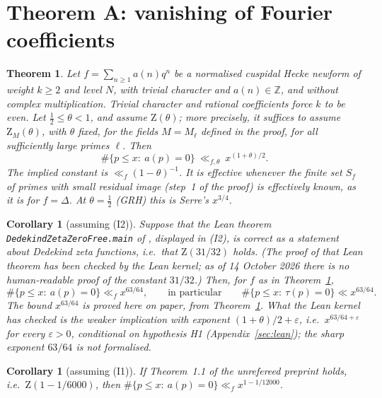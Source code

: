 \documentclass[11pt]{amsart}
\newtheorem{mainthm}{Theorem}
\newtheorem{corollary}[theorem]{Corollary}
\theoremstyle{definition}
\theoremstyle{remark}
\newcommand{\Z}{\mathbb{Z}}
\newcommand{\Zt}{\mathrm{Z}}       %
\begin{document}
\section{Theorem A: vanishing of Fourier coefficients}\label{sec:A}

\begin{mainthm}\label{thm:A}
Let $f=\sum_{n\ge1}a(n)q^n$ be a normalised cuspidal Hecke newform of weight $k\ge2$ and level $N$, with trivial
character and $a(n)\in\Z$, and without complex multiplication. Trivial character and rational coefficients force $k$
to be even. Let $\tfrac12\le\theta<1$, and assume $\Zt(\theta)$; more precisely, it suffices to assume
$\Zt_M(\theta)$, with $\theta$ fixed, for the fields $M=M_\ell$ defined in the proof, for all sufficiently large
primes $\ell$. Then
\[
  \#\{p\le x:\ a(p)=0\}\ \ll_{f,\theta}\ x^{(1+\theta)/2}.
\]
The implied constant is $\ll_f(1-\theta)^{-1}$. It is effective whenever the finite set $S_f$ of primes with small
residual image (step~1 of the proof) is effectively known, as it is for $f=\Delta$. At $\theta=\frac12$ (GRH) this is
Serre's $x^{3/4}$.
\end{mainthm}

\begin{corollary}[assuming (I2)]\label{cor:A-I2}
Suppose that the Lean theorem \texttt{DedekindZetaZeroFree.main} of \cite{CT-Lean}, displayed in (I2), is correct as a
statement about Dedekind zeta functions, i.e.\ that $\Zt(31/32)$ holds. (The proof of that Lean theorem has been
checked by the Lean kernel; as of 14 October 2026 there is no human-readable proof of the constant $31/32$.) Then, for
$f$ as in Theorem~\ref{thm:A},
\[
  \#\{p\le x:\ a(p)=0\}\ll_f x^{63/64},\qquad\text{in particular}\qquad \#\{p\le x:\ \tau(p)=0\}\ll x^{63/64}.
\]
The bound $x^{63/64}$ is proved here on paper, from Theorem~\ref{thm:A}. What the Lean kernel has checked is the
weaker implication with exponent $(1+\theta)/2+\varepsilon$, i.e.\ $x^{63/64+\varepsilon}$ for every $\varepsilon>0$,
conditional on hypothesis H1 (Appendix~\ref{sec:lean}); the sharp exponent $63/64$ is not formalised.
\end{corollary}

\begin{corollary}[assuming (I1)]\label{cor:A-I1}
If Theorem~1.1 of the unrefereed preprint \cite{CT} holds, i.e.\ $\Zt(1-1/6000)$, then
$\#\{p\le x:\ a(p)=0\}\ll_f x^{1-1/12000}$.
\end{corollary}
\end{document}
